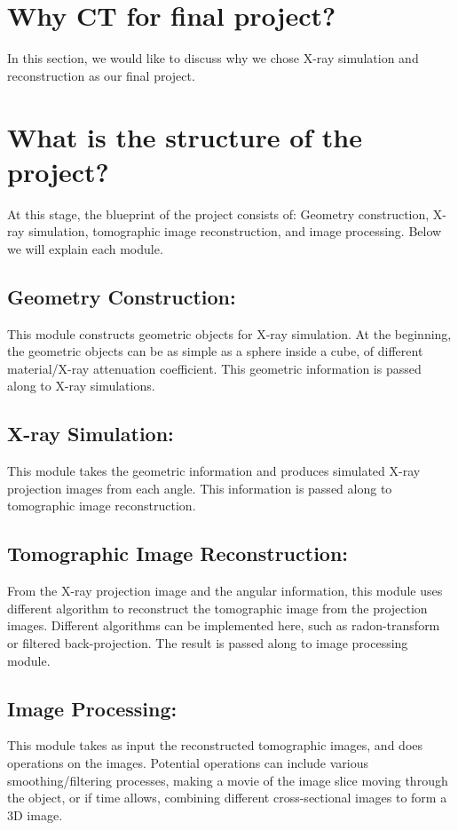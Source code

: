 \documentclass[11]{article}
\begin{document}
\section{Why CT for final project?}
In this section, we would like to discuss why we chose X-ray simulation and reconstruction as our final project.

\section{What is the structure of the project?}
At this stage, the blueprint of the project consists of: Geometry construction, X-ray simulation, tomographic image reconstruction, and image processing. Below we will explain each module.

	\subsection{Geometry Construction:}
		This module constructs geometric objects for X-ray simulation. At the beginning, the geometric objects can be as simple as a sphere inside a cube, of different material/X-ray attenuation coefficient. This geometric information is passed along to X-ray simulations.

	\subsection{X-ray Simulation:}
		This module takes the geometric information and produces simulated X-ray projection images from each angle. This information is passed along to tomographic image reconstruction.

	\subsection{Tomographic Image Reconstruction:}
		From the X-ray projection image and the angular information, this module uses different algorithm to reconstruct the tomographic image from the projection images. Different algorithms can be implemented here, such as radon-transform or filtered back-projection. The result is passed along to image processing module.

	\subsection{Image Processing:}
		This module takes as input the reconstructed tomographic images, and does operations on the images. Potential operations can include various smoothing/filtering processes, making a movie of the image slice moving through the object, or if time allows, combining different cross-sectional images to form a 3D image.
	
\end{document}
